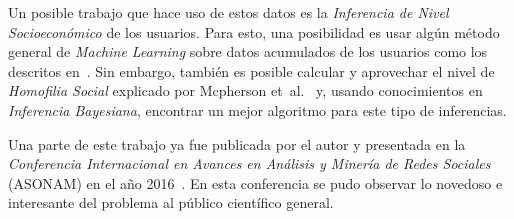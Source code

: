 \documentclass{article}
\begin{document}
Un posible trabajo que hace uso de estos datos es la \emph{Inferencia de Nivel Socioeconómico} de los usuarios. Para esto, una posibilidad es usar algún método general de \emph{Machine Learning} sobre datos acumulados de los usuarios como los descritos en~\cite{oskardottir2016}. Sin embargo, también es posible calcular y aprovechar el nivel de \emph{Homofilia Social} explicado por Mcpherson et~al.~\cite{mcpherson2001birds} y, usando conocimientos en \emph{Inferencia Bayesiana}, encontrar un mejor algoritmo para este tipo de inferencias.

Una parte de este trabajo ya fue publicada por el autor y presentada en la \emph{Conferencia Internacional en Avances en Análisis y Minería de Redes Sociales} (ASONAM) en el año 2016~\cite{fixmanasonam2016}. En esta conferencia se pudo observar lo novedoso e interesante del problema al público científico general.

{}
\end{document}
